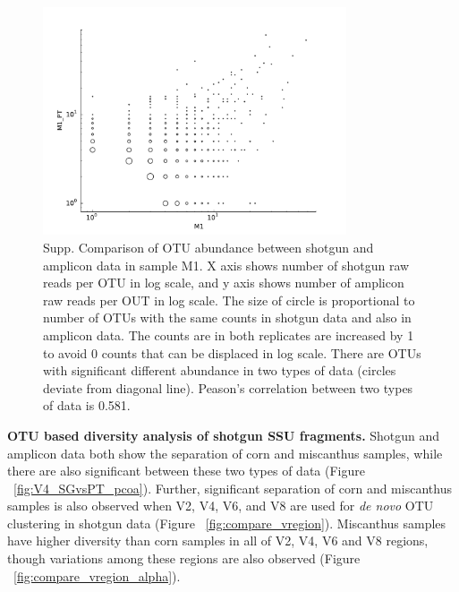 \documentclass[12pt]{article}
\begin{document}
\begin{figure}[tbph!]
  \centering
  \includegraphics[width=0.8\textwidth]{figs/M1_SGvsPT_OTUscat}
  \caption[Comparison of OTU abundance between shotgun and amplicon data in sample M1. ]{Supp. Comparison of OTU abundance between shotgun and amplicon data in sample M1. X axis shows number of shotgun raw reads per OTU in log scale, and y axis shows number of amplicon raw reads per OUT in log scale. The size of circle is proportional to number of OTUs with the same counts in shotgun data and also in amplicon data. The counts are in both replicates are increased by 1 to avoid 0 counts that can be displaced in log scale. There are OTUs with significant different abundance in two types of data (circles deviate from diagonal line). Peason’s correlation between two types of data is 0.581.}
  \label{fig:M1_SGvsPT_OTUscat}
\end{figure}

  {\bf OTU based diversity analysis of shotgun SSU fragments. } 
Shotgun and amplicon data both show the separation of corn and miscanthus samples, while there are also significant between these two types of data (Figure ~\ref{fig:V4_SGvsPT_pcoa}). Further, significant separation of corn and miscanthus samples is also observed when V2, V4, V6, and V8 are used for {\em de novo} OTU clustering in shotgun data (Figure ~\ref{fig:compare_vregion}). Miscanthus samples have higher diversity than corn samples in all of V2, V4, V6 and V8 regions, though variations among these regions are also observed (Figure ~\ref{fig:compare_vregion_alpha}).
\end{document}
